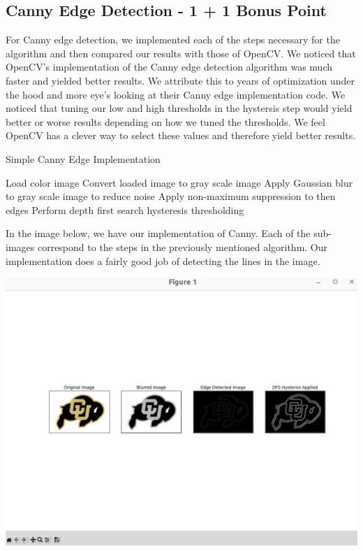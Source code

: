 \documentclass{article}
\numberwithin{equation}{section} %
\numberwithin{figure}{section} %
\numberwithin{table}{section} %
\begin{document}
\begin{framed}
\subsection{Canny Edge Detection - 1 + 1 Bonus Point}
\label{sec:CannyEdge}

For Canny edge detection, we implemented each of the steps necessary for the algorithm and then compared our results with those of OpenCV.  We noticed that OpenCV's implementation of the Canny edge detection algorithm was much faster and yielded better results.  We attribute this to years of optimization under the hood and more eye's looking at their Canny edge implementation code.  We noticed that tuning our low and high thresholds in the hystersis step would yield better or worse results depending on how we tuned the thresholds. We feel OpenCV has a clever way to select these values and therefore yield better results.

\begin{algorithm}[H]
\caption{Simple Canny Edge Implementation}\label{alg:cap}
\begin{algorithmic}[1] %
\State Load color image 
\State Convert loaded image to gray scale image
\State Apply Gaussian blur to gray scale image to reduce noise
\State Apply non-maximum suppression to then edges
\State Perform depth first search hysteresis thresholding
\end{algorithmic}
\end{algorithm}

In the image below, we have our implementation of Canny.  Each of the sub-images correspond to the steps in the previously mentioned algorithm. Our implementation does a fairly good job of detecting the lines in the image.   

\begin{center}
\includegraphics[scale=.25]{ourCanny.png}
\end{center}


\end{framed}
\end{document}
